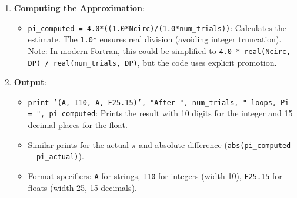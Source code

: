 \begin{enumerate}
\begin{itemize}
\begin{itemize}
\item \texttt{x = lcgrandom()}: Generates a pseudo-random number in [0,1) for the x-coordinate.
\item \texttt{y = lcgrandom()}: Same for y-coordinate.
\item \texttt{if ((x*x + y*y) \textless = r\_squared) then}: Checks if the point (x,y) is inside the quarter-circle by testing if the squared distance from origin (x\textsuperscript{2} + y\textsuperscript{2}) $\leq$ 1.0.

\begin{itemize}
\item If true, \texttt{Ncirc = Ncirc + 1}: Increments the counter.
\end{itemize}
\end{itemize}


\item This implements the core Monte Carlo method: the probability a random point in the unit square falls inside the quarter-circle is $\pi$/4, so $\pi$ $\approx$ 4 * (Ncirc / num\_trials).
\end{itemize}


\item \textbf{Computing the Approximation}:

\begin{itemize}
\item \texttt{pi\_computed = 4.0*((1.0*Ncirc)/(1.0*num\_trials))}: Calculates the estimate. The \texttt{1.0*} ensures real division (avoiding integer truncation). Note: In modern Fortran, this could be simplified to \texttt{4.0 * real(Ncirc, DP) / real(num\_trials, DP)}, but the code uses explicit promotion.
\end{itemize}


\item \textbf{Output}:

\begin{itemize}
\item \texttt{print '(A, I10, A, F25.15)', "After ", num\_trials, " loops, Pi = ", pi\_computed}: Prints the result with 10 digits for the integer and 15 decimal places for the float.
\item Similar prints for the actual $\pi$ and absolute difference (\texttt{abs(pi\_computed - pi\_actual)}).
\item Format specifiers: \texttt{A} for strings, \texttt{I10} for integers (width 10), \texttt{F25.15} for floats (width 25, 15 decimals).
\end{itemize}
\end{enumerate}

